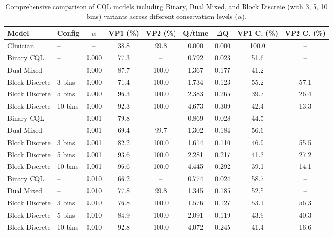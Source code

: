 \begin{table}[ht]
\centering
\caption{Comprehensive comparison of CQL models including Binary, Dual Mixed, and Block Discrete (with 3, 5, 10 bins) variants across different conservatism levels ($\alpha$).}
\label{tab:cql_comparison}
\begin{tabular}{llccccccc}
\toprule
Model & Config & $\alpha$ & VP1 (\%) & VP2 (\%) & Q/time & $\Delta$Q & VP1 C. (\%) & VP2 C. (\%) \\
\midrule
Clinician & -- & -- & 38.8 & 99.8 & 0.000 & 0.000 & 100.0 & -- \\
\midrule
Binary CQL & -- & 0.000 & 77.3 & -- & 0.792 & 0.023 & 51.6 & -- \\
Dual Mixed & -- & 0.000 & 87.7 & 100.0 & 1.367 & 0.177 & 41.2 & -- \\
Block Discrete & 3 bins & 0.000 & 71.4 & 100.0 & 1.734 & 0.123 & 55.2 & 57.1 \\
Block Discrete & 5 bins & 0.000 & 96.3 & 100.0 & 2.383 & 0.265 & 39.7 & 26.4 \\
Block Discrete & 10 bins & 0.000 & 92.3 & 100.0 & 4.673 & 0.309 & 42.4 & 13.3 \\
\midrule
Binary CQL & -- & 0.001 & 79.8 & -- & 0.869 & 0.028 & 44.5 & -- \\
Dual Mixed & -- & 0.001 & 69.4 & 99.7 & 1.302 & 0.184 & 56.6 & -- \\
Block Discrete & 3 bins & 0.001 & 82.2 & 100.0 & 1.614 & 0.110 & 46.9 & 55.5 \\
Block Discrete & 5 bins & 0.001 & 93.6 & 100.0 & 2.281 & 0.217 & 41.3 & 27.2 \\
Block Discrete & 10 bins & 0.001 & 96.6 & 100.0 & 4.445 & 0.292 & 39.1 & 14.1 \\
\midrule
Binary CQL & -- & 0.010 & 66.2 & -- & 0.774 & 0.024 & 58.7 & -- \\
Dual Mixed & -- & 0.010 & 77.8 & 99.8 & 1.345 & 0.185 & 52.5 & -- \\
Block Discrete & 3 bins & 0.010 & 76.8 & 100.0 & 1.576 & 0.127 & 53.1 & 56.3 \\
Block Discrete & 5 bins & 0.010 & 84.9 & 100.0 & 2.091 & 0.119 & 43.9 & 40.3 \\
Block Discrete & 10 bins & 0.010 & 92.8 & 100.0 & 4.072 & 0.245 & 41.4 & 16.6 \\
\bottomrule
\end{tabular}
\end{table}